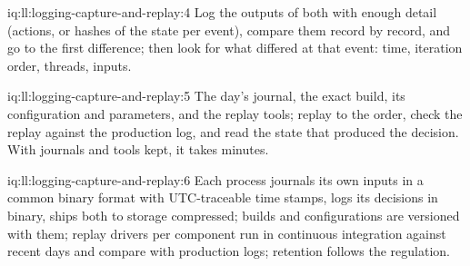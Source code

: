 \begin{solution}{iq:ll:logging-capture-and-replay:4}
Log the outputs of both with enough detail (actions, or hashes of the state per event), compare them record by record, and go
to the first difference; then look for what differed at that event: time, iteration order, threads, inputs.
\end{solution}

\begin{solution}{iq:ll:logging-capture-and-replay:5}
The day's journal, the exact build, its configuration and parameters, and the replay tools; replay to the order, check the
replay against the production log, and read the state that produced the decision. With journals and tools kept, it takes
minutes.
\end{solution}

\begin{solution}{iq:ll:logging-capture-and-replay:6}
Each process journals its own inputs in a common binary format with UTC-traceable time stamps, logs its decisions in binary,
ships both to storage compressed; builds and configurations are versioned with them; replay drivers per component run in
continuous integration against recent days and compare with production logs; retention follows the regulation.
\end{solution}
